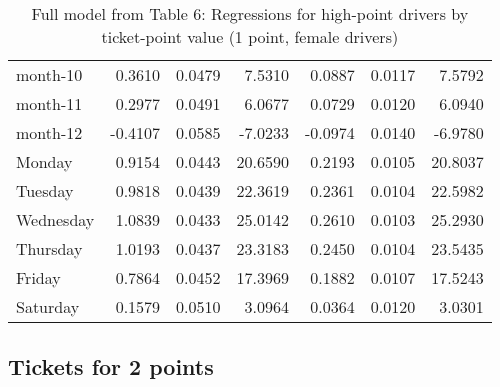 \documentclass[10pt]{article}
\begin{document}
\begin{table}[ht]
\begin{tabular}{lrrrrrr}
  month-10 & 0.3610 & 0.0479 & 7.5310 & 0.0887 & 0.0117 & 7.5792 \\ 
  month-11 & 0.2977 & 0.0491 & 6.0677 & 0.0729 & 0.0120 & 6.0940 \\ 
  month-12 & -0.4107 & 0.0585 & -7.0233 & -0.0974 & 0.0140 & -6.9780 \\ 
  Monday & 0.9154 & 0.0443 & 20.6590 & 0.2193 & 0.0105 & 20.8037 \\ 
  Tuesday & 0.9818 & 0.0439 & 22.3619 & 0.2361 & 0.0104 & 22.5982 \\ 
  Wednesday & 1.0839 & 0.0433 & 25.0142 & 0.2610 & 0.0103 & 25.2930 \\ 
  Thursday & 1.0193 & 0.0437 & 23.3183 & 0.2450 & 0.0104 & 23.5435 \\ 
  Friday & 0.7864 & 0.0452 & 17.3969 & 0.1882 & 0.0107 & 17.5243 \\ 
  Saturday & 0.1579 & 0.0510 & 3.0964 & 0.0364 & 0.0120 & 3.0301 \\ 
   \hline
\end{tabular}
\caption{Full model from Table 6: Regressions for high-point drivers by ticket-point value (1 point, female drivers)} 
\label{tab_6_1_pts_no_age_F}
\end{table}


\clearpage
\pagebreak




\subsection{Tickets for 2 points}



\end{document}
